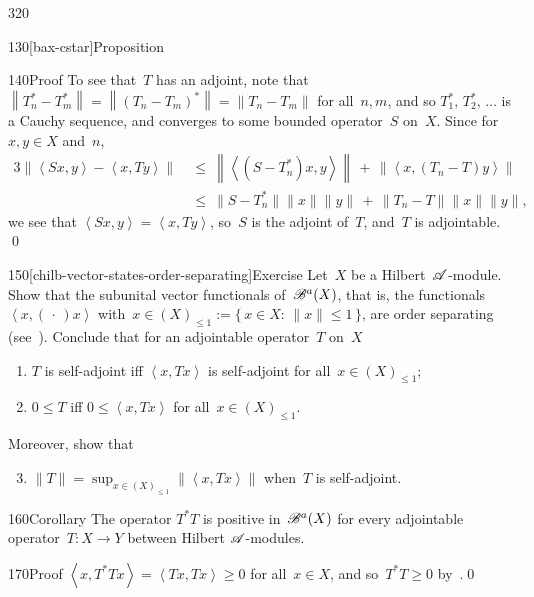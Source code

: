 \begin{parsec}{320}
\begin{point}{130}[bax-cstar]{Proposition}
\begin{point}{140}{Proof}
To see that~$T$ has an adjoint,
note that~$\left\|T_n^*-T_m^*\right\|
=\left\|(T_n-T_m)^*\right\|
=\left\|T_n-T_m\right\|$
for all~$n,m$, and so $T_1^*,\,T_2^*,\,\dotsc$
is a Cauchy sequence,
and converges to some bounded operator~$S$ on~$X$.
Since for~$x,y\in X$ and~$n$,
\begin{alignat*}{3}
\left\|\left<Sx,y\right>-\left<x,Ty\right>\right\|
\ &\leq\ 
\left\|\left<(S-T^*_n)x,y\right>\right\|
\,+\,
\left\|\left<x,(T_n-T)y\right>\right\|
\\
\ &\leq\ 
\|S-T^*_n\|\|x\|\|y\|\,+\,\|T_n-T\|\|x\|\|y\|,
\end{alignat*}
we see that $\left<Sx,y\right>=\left<x,Ty\right>$,
so~$S$ is the adjoint of~$T$,
and~$T$ is adjointable.
\qed
\end{point}
\end{point}
\begin{point}{150}[chilb-vector-states-order-separating]{Exercise}%
Let~$X$ be a Hilbert~$\mathscr{A}$-module.
Show that
the subunital vector functionals%
of~$\mathscr{B}^a(X)$,
that is, the functionals $\left<x,(\,\cdot\,)x\right>$
with~$x\in (X)_{\leq 1}:=\{\,x\in X\colon\,\|x\|\leq 1\,\}$,
are order separating (see~\sref{separating}).
Conclude that
for an adjointable operator~$T$ on~$X$
\begin{enumerate}
\item
$T$ is self-adjoint iff $\left<x,Tx\right>$
is self-adjoint for all~$x\in (X)_{\leq 1}$;
\item
$0\leq T$ iff $0\leq\left<x,Tx\right>$
for all~$x\in (X)_{\leq 1}$.
\end{enumerate}
Moreover, show that
\begin{enumerate}
\setcounter{enumi}{2}
\item
	$\|T\|=\sup_{x\in (X)_{\leq 1}}\|\left<x,Tx\right>\|$
when~$T$ is self-adjoint.
\end{enumerate}
\end{point}
\begin{point}{160}{Corollary}%
The operator
$T^*T$ is positive
in~$\mathscr{B}^a(X)$
for every adjointable operator~$T\colon X\to Y$
between Hilbert $\mathscr{A}$-modules.
\begin{point}{170}{Proof}%
$\left<x,T^*Tx\right>=
\left<Tx,Tx\right> \geq 0$
for all~$x\in X$,
and so~$T^*T\geq 0$ by~.\qed
\end{point}
\end{point}
\end{parsec}
